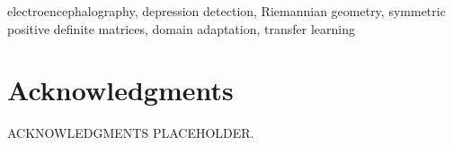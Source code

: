 \documentclass[journal]{IEEEtran}
\begin{document}
\begin{IEEEkeywords}
electroencephalography, depression detection, Riemannian geometry,
symmetric positive definite matrices, domain adaptation, transfer learning
\end{IEEEkeywords}








\section*{Acknowledgments}
ACKNOWLEDGMENTS PLACEHOLDER.




\end{document}
